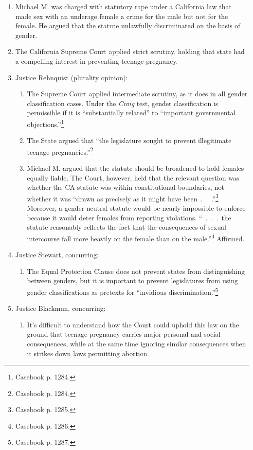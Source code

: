 \begin{enumerate}
    \item Michael M. was charged with statutory rape under a California law 
    that made sex with an underage female a crime for the male but not for the 
    female. He argued that the statute unlawfully discriminated on the basis 
    of gender.
    \item The California Supreme Court applied strict scrutiny, holding that 
    state had a compelling interest in preventing teenage pregnancy.
    \item Justice Rehnquist (plurality opinion):
    \begin{enumerate}
        \item The Supreme Court applied intermediate scrutiny, as it does in 
        all gender classification cases. Under the \emph{Craig} test, gender 
        classification is permissible if it is ``substantially related'' to 
        ``important governmental objections.''\footnote{Casebook p. 1284.}
        \item The State argued that ``the legislature sought to prevent 
        illegitimate teenage pregnancies.''\footnote{Casebook p. 1284.}
        \item Michael M. argued that the statute should be broadened to hold 
        females equally liable. The Court, however, held that the relevant 
        question was whether the CA statute was within constitutional 
        boundaries, not whether it was ``drawn as precisely as it might have 
        been~.~.~.''\footnote{Casebook p. 1285.} Moreover, a gender-neutral 
        statute would be nearly impossible to enforce because it would deter 
        females from reporting violations.
        ``~.~.~.~the statute reasonably reflects the fact that the 
        consequences of sexual intercourse fall more heavily on the female 
        than on the male.''\footnote{Casebook p. 1286.} Affirmed.
    \end{enumerate}
    \item Justice Stewart, concurring:
    \begin{enumerate}
        \item The Equal Protection Clause does not prevent states from 
        distinguishing between genders, but it is important to prevent 
        legislatures from using gender classifications as pretexts for 
        ``invidious discrimination.''\footnote{Casebook p. 1287.}
    \end{enumerate}
    \item Justice Blackmun, concurring:
    \begin{enumerate}
        \item It's difficult to understand how the Court could uphold this law 
        on the ground that teenage pregnancy carries major personal and social 
        consequences, while at the same time ignoring similar consequences 
        when it strikes down laws permitting abortion.
    \end{enumerate}
\end{enumerate}

